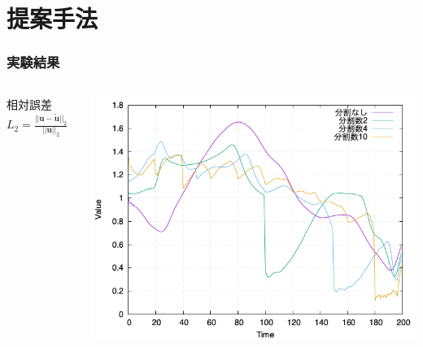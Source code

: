 \documentclass[aspectratio=169,dvipdfmx,hyperref={bookmarks=true}]{beamer}
\begin{document}
\section{提案手法}
\begin{frame}
\frametitle{実験結果}
\vspace{-10pt}
\begin{columns}[T]
	\begin{column}{0.15\linewidth}
	\begin{block}{}
	相対誤差$L_2 = \frac{|| \bm{u} - \bm{\widetilde{u}} ||_2}{||  \bm{u} ||_2}$
	\end{block}
    	\end{column}
	\begin{column}{0.85\linewidth}
	\vspace{-20pt}
		\includegraphics[width=0.9\linewidth]{images/128error_obstacle.png}
	   \end{column}
    \end{columns}
 \end{frame}
  
\end{document}
